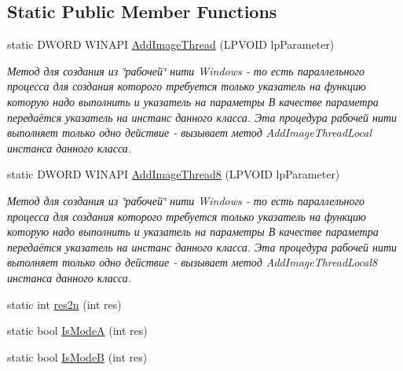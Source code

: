 \subsection*{Static Public Member Functions}
\begin{DoxyCompactItemize}
\item 
static D\+W\+O\+R\+D W\+I\+N\+A\+P\+I \hyperlink{class_c_v_i_engine_base_ad9c65ff1caec8b5042fd55628c515373}{Add\+Image\+Thread} (L\+P\+V\+O\+I\+D lp\+Parameter)
\begin{DoxyCompactList}\small\item\em Метод для создания из \char`\"{}рабочей\char`\"{} нити Windows -\/ то есть параллельного процесса для создания которого требуется только указатель на функцию которую надо выполнить и указатель на параметры В качестве параметра передаётся указатель на инстанс данного класса. Эта процедура рабочей нити выполняет только одно действие -\/ вызывает метод Add\+Image\+Thread\+Local инстанса данного класса. \end{DoxyCompactList}\item 
static D\+W\+O\+R\+D W\+I\+N\+A\+P\+I \hyperlink{class_c_v_i_engine_base_acb273d8d1df0ad615bec58b0a9c5f1cc}{Add\+Image\+Thread8} (L\+P\+V\+O\+I\+D lp\+Parameter)
\begin{DoxyCompactList}\small\item\em Метод для создания из \char`\"{}рабочей\char`\"{} нити Windows -\/ то есть параллельного процесса для создания которого требуется только указатель на функцию которую надо выполнить и указатель на параметры В качестве параметра передаётся указатель на инстанс данного класса. Эта процедура рабочей нити выполняет только одно действие -\/ вызывает метод Add\+Image\+Thread\+Local8 инстанса данного класса. \end{DoxyCompactList}\item 
static int \hyperlink{class_c_v_i_engine_base_a96058275b74d792351596a389ee29bbd}{res2n} (int res)
\item 
static bool \hyperlink{class_c_v_i_engine_base_a2f8fba45abd4bb564101fb090de26a48}{Is\+Mode\+A} (int res)
\item 
static bool \hyperlink{class_c_v_i_engine_base_a7029194ddd71a7322746e962a3ed5b46}{Is\+Mode\+B} (int res)
\end{DoxyCompactItemize}
